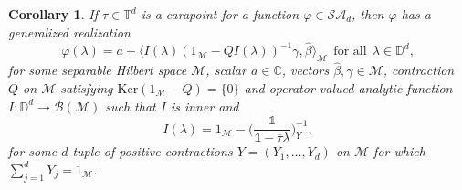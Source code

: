\documentclass[11pt, reqno]{amsart}
\newtheorem{corollary}[theorem]{Corollary}
\newcommand\1{\boldsymbol {1}}
\numberwithin{equation}{section}
\begin{document}
\begin{corollary}\label{generalizedrealizationcorollary}
If $\tau\in\mathbb{T}^{d}$ is a carapoint for a function $\varphi\in\mathcal{SA}_{d}$, then $\varphi$ has a generalized realization
\begin{equation}\label{realizationforcarapoint}
\varphi(\lambda) = a+\langle I(\lambda)(1_{\mathcal{M}}-QI(\lambda))^{-1}\gamma,{\hat{\beta}}\rangle_{\mathcal{M}}~~\text{for all}~~\lambda\in\mathbb{D}^{d},
\end{equation}
for some separable Hilbert space $\mathcal{M}$,  scalar $a\in\mathbb{C}$, vectors ${\hat{\beta}}, \gamma\in\mathcal{M}$,  contraction $Q$ on $\mathcal{M}$ satisfying $\mathrm{Ker}(1_{\mathcal{M}}-Q)=\{0\}$ and  operator-valued analytic function $I:\mathbb{D}^{d}\rightarrow \mathcal{B(M)}$ such that $I$ is inner and
\begin{equation}\label{Ioperatoragainhere}
I(\lambda)=1_{\mathcal{M}}-\bigg(\dfrac{\mathds{1}}{\mathds{1}-\overline{\tau}\lambda}\bigg)^{-1}_{Y},
\end{equation}
for some $d$-tuple of positive contractions $Y=(Y_{1},\hdots,Y_{d})$ on $\mathcal{M}$ for which $\sum_{j=1}^{d}Y_{j}=1_{\mathcal{M}}$.
\end{corollary}
\end{document}
